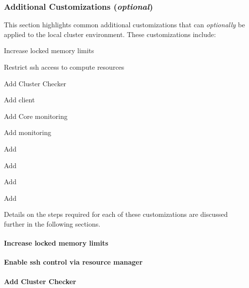 \documentclass[letterpaper]{article}
\begin{document}

\subsubsection{Additional Customizations ({\em optional})} \label{sec:addl_customizations}

This section highlights common additional customizations that
can {\em optionally} be applied to the
local cluster environment. These customizations include:

\begin{itemize*}
\item Increase locked memory limits
\item Restrict ssh access to compute resources
\item Add Cluster Checker
\item Add \Lustre{} client
\item Add \Nagios{} Core monitoring
\item Add \Ganglia{} monitoring
\item Add \clustershell{}
\item Add \mrsh{}
\item Add \genders{}
\item Add \powerman{}
\end{itemize*}

\noindent Details on the steps required for each of these customizations are
discussed further in the following sections.

\paragraph{Increase locked memory limits}
 

\paragraph{Enable ssh control via resource manager} 


\paragraph{Add Cluster Checker} \label{sec:add_clck}

\end{document}
